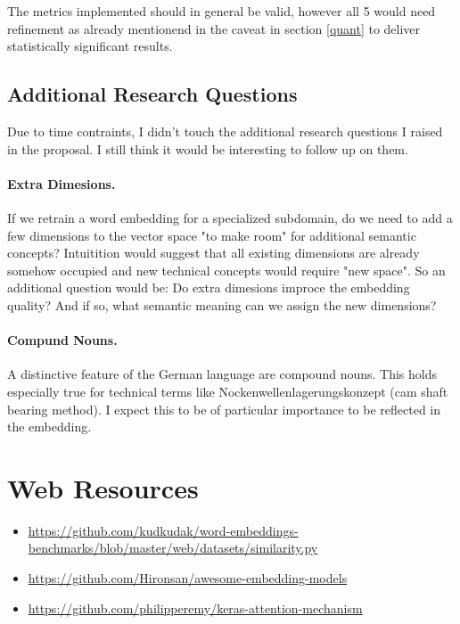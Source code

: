 \documentclass[10pt,a4paper]{article}
\begin{document}
The metrics implemented should in general be valid,  however all 5 would need refinement as already mentionend in the caveat in section \ref{quant} to deliver statistically significant results.

	\subsection {Additional Research Questions}
	Due to time contraints, I didn't touch the additional research questions I raised in the proposal. I still think it would be interesting to follow up on them. 
	\paragraph{Extra Dimesions.} If we retrain a word embedding for a specialized subdomain, do we need to add a few dimensions to the vector space "to make room" for additional semantic concepts? Intuitition would suggest that all existing dimensions are already somehow occupied and new technical concepts would require "new space". So an additional question would be: Do extra dimesions improce the embedding quality? And if so, what semantic meaning can we assign the new dimensions? 
	\paragraph{Compund Nouns.} A distinctive feature of the German language are compound nouns. This holds especially true for technical terms like Nockenwellenlagerungskonzept (cam shaft bearing method). I expect this to be of particular importance to be reflected in the embedding. 
	


\section*{Web Resources}
\label{web_resources}
\begin{itemize}
	\item \url{https://github.com/kudkudak/word-embeddings-benchmarks/blob/master/web/datasets/similarity.py}
	\item \url{https://github.com/Hironsan/awesome-embedding-models}
	\item \url{https://github.com/philipperemy/keras-attention-mechanism}
\end{itemize}



\nocite{*}




	
	
\end{document}
